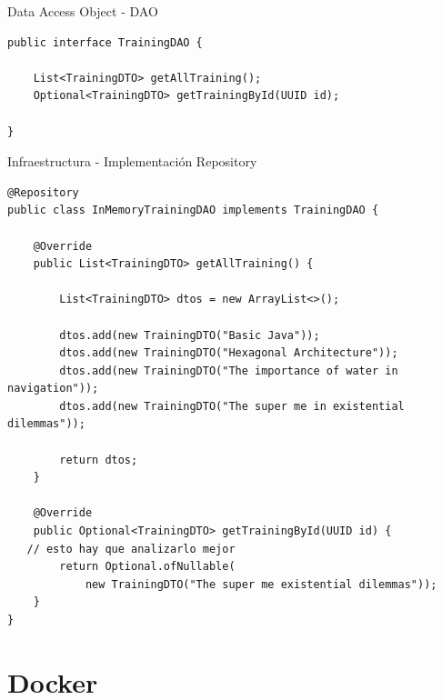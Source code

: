 \documentclass[10pt]{beamer}
\begin{document}
\begin{frame}[fragile]{Data Access Object - DAO}

\begin{verbatim}
public interface TrainingDAO {

    List<TrainingDTO> getAllTraining();
    Optional<TrainingDTO> getTrainingById(UUID id);

}
\end{verbatim}

\end{frame}


\begin{frame}[fragile]{Infraestructura - Implementación Repository}

\begin{verbatim}
@Repository
public class InMemoryTrainingDAO implements TrainingDAO {

    @Override
    public List<TrainingDTO> getAllTraining() {

        List<TrainingDTO> dtos = new ArrayList<>();

        dtos.add(new TrainingDTO("Basic Java"));
        dtos.add(new TrainingDTO("Hexagonal Architecture"));
        dtos.add(new TrainingDTO("The importance of water in navigation"));
        dtos.add(new TrainingDTO("The super me in existential dilemmas"));

        return dtos;
    }

    @Override
    public Optional<TrainingDTO> getTrainingById(UUID id) {
   // esto hay que analizarlo mejor
        return Optional.ofNullable(
            new TrainingDTO("The super me existential dilemmas"));
    }
}
\end{verbatim}


\end{frame}

\section{Docker}
\end{document}
